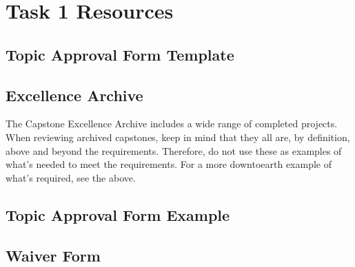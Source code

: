 \documentclass[letterpaper,10pt,english]{jupyterBook}
\begin{document}
\section{Task 1 Resources}
\label{\detokenize{resources:task-1-resources}}\label{\detokenize{resources:resources-task1}}

\subsection{Topic Approval Form Template}
\label{\detokenize{resources:topic-approval-form-template}}\label{\detokenize{resources:resources-task1-task1example}}\begin{quote}

\sphinxAtStartPar
{}
\end{quote}


\subsection{Excellence Archive}
\label{\detokenize{resources:excellence-archive}}\label{\detokenize{resources:resources-task1-excellence}}
\sphinxAtStartPar
The Capstone Excellence Archive includes a wide range of completed projects. When reviewing archived capstones, keep in mind that they all are, by definition, above and beyond the requirements. Therefore, do not use these as examples of what’s needed to meet the requirements. For a more down\sphinxhyphen{}to\sphinxhyphen{}earth example of what’s required, see the {\hyperref[\detokenize{resources:resources-examples}]{}} above.


\subsection{Topic Approval Form Example}
\label{\detokenize{resources:topic-approval-form-example}}\begin{quote}

\sphinxAtStartPar
{}
\end{quote}


\subsection{Waiver Form}
\label{\detokenize{resources:waiver-form}}\begin{quote}

\sphinxAtStartPar
{}
\end{quote}
\end{document}
